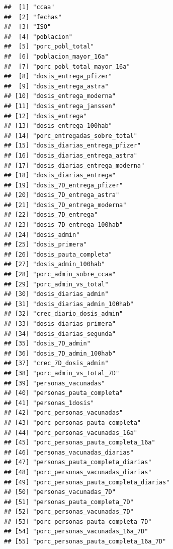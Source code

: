 \documentclass[11pt,]{book}
\begin{document}
\begin{verbatim}
##  [1] "ccaa"                                
##  [2] "fechas"                              
##  [3] "ISO"                                 
##  [4] "poblacion"                           
##  [5] "porc_pobl_total"                     
##  [6] "poblacion_mayor_16a"                 
##  [7] "porc_pobl_total_mayor_16a"           
##  [8] "dosis_entrega_pfizer"                
##  [9] "dosis_entrega_astra"                 
## [10] "dosis_entrega_moderna"               
## [11] "dosis_entrega_janssen"               
## [12] "dosis_entrega"                       
## [13] "dosis_entrega_100hab"                
## [14] "porc_entregadas_sobre_total"         
## [15] "dosis_diarias_entrega_pfizer"        
## [16] "dosis_diarias_entrega_astra"         
## [17] "dosis_diarias_entrega_moderna"       
## [18] "dosis_diarias_entrega"               
## [19] "dosis_7D_entrega_pfizer"             
## [20] "dosis_7D_entrega_astra"              
## [21] "dosis_7D_entrega_moderna"            
## [22] "dosis_7D_entrega"                    
## [23] "dosis_7D_entrega_100hab"             
## [24] "dosis_admin"                         
## [25] "dosis_primera"                       
## [26] "dosis_pauta_completa"                
## [27] "dosis_admin_100hab"                  
## [28] "porc_admin_sobre_ccaa"               
## [29] "porc_admin_vs_total"                 
## [30] "dosis_diarias_admin"                 
## [31] "dosis_diarias_admin_100hab"          
## [32] "crec_diario_dosis_admin"             
## [33] "dosis_diarias_primera"               
## [34] "dosis_diarias_segunda"               
## [35] "dosis_7D_admin"                      
## [36] "dosis_7D_admin_100hab"               
## [37] "crec_7D_dosis_admin"                 
## [38] "porc_admin_vs_total_7D"              
## [39] "personas_vacunadas"                  
## [40] "personas_pauta_completa"             
## [41] "personas_1dosis"                     
## [42] "porc_personas_vacunadas"             
## [43] "porc_personas_pauta_completa"        
## [44] "porc_personas_vacunadas_16a"         
## [45] "porc_personas_pauta_completa_16a"    
## [46] "personas_vacunadas_diarias"          
## [47] "personas_pauta_completa_diarias"     
## [48] "porc_personas_vacunadas_diarias"     
## [49] "porc_personas_pauta_completa_diarias"
## [50] "personas_vacunadas_7D"               
## [51] "personas_pauta_completa_7D"          
## [52] "porc_personas_vacunadas_7D"          
## [53] "porc_personas_pauta_completa_7D"     
## [54] "porc_personas_vacunadas_16a_7D"      
## [55] "porc_personas_pauta_completa_16a_7D" 

\end{verbatim}
\end{document}
